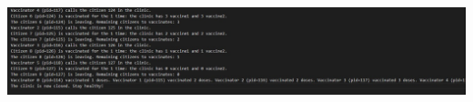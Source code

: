 \documentclass[12pt]{article}
\begin{document}
\includegraphics[]{"example2 n5 v5 c9 b11 t1.jpg"}
\end{document}
